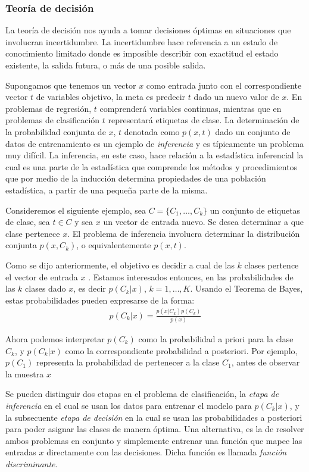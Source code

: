 \subsubsection{Teoría de decisión}
	
	La teoría de decisión nos ayuda a tomar decisiones óptimas en situaciones que involucran incertidumbre. La incertidumbre hace referencia a un estado de conocimiento limitado donde es imposible describir con exactitud el estado existente, la salida futura, o más de una posible salida.
	
	Supongamos que tenemos un vector $x$ como entrada junto con el correspondiente vector $t$ de variables objetivo, la meta es predecir $t$ dado un nuevo valor de $x$. En problemas de regresión, $t$ comprenderá variables continuas, mientras que en problemas de clasificación $t$ representará etiquetas de clase. La determinación de la probabilidad conjunta de $x$, $t$ denotada como $p(x,t)$ dado un conjunto de datos de entrenamiento es un ejemplo de \textit{inferencia} y es típicamente un problema muy difícil. La inferencia, en este caso, hace relación a la estadística inferencial la cual es una parte de la estadística que comprende los métodos y procedimientos que por medio de la inducción determina propiedades de una población estadística, a partir de una pequeña parte de la misma.
	
	Consideremos el siguiente ejemplo, sea $C=\{C_1,\dots,C_k\}$ un conjunto de etiquetas de clase, sea $t \in C$ y sea $x$ un vector de entrada nuevo. Se desea determinar a que clase pertenece $x$. El problema de inferencia involucra determinar la distribución conjunta $p(x,C_k)$, o equivalentemente $p(x,t)$.

	Como se dijo anteriormente, el objetivo es decidir a cual de las $k$ clases pertence el vector de entrada $x$ . Estamos interesados entonces, en las probabilidades de las $k$ clases dado $x$, es decir $p(C_k|x)$, $k=1,\dots,K$. Usando el Teorema de Bayes, estas probabilidades pueden expresarse de la forma:
		\begin{align*}
			p(C_k|x) = \frac{p(x|C_k)p(C_k)}{p(x)}
		\end{align*}

	Ahora podemos interpretar $p(C_k)$ como la probabilidad a priori para la clase $C_k$, y $p(C_k|x)$ como la correspondiente probabilidad a posteriori. Por ejemplo, $p(C_1)$ representa la probabilidad de pertenecer a la clase $C_1$, antes de observar la muestra $x$
	
	Se pueden distinguir dos etapas en el problema de clasificación, la \textit{etapa de inferencia} en el cual se usan los datos para entrenar el modelo para $p(C_k|x)$, y la subsecuente \textit{etapa de decisión} en la cual se usan las probabilidades a posteriori para poder asignar las clases de manera óptima. Una alternativa, es la de resolver ambos problemas en conjunto y simplemente entrenar una función que mapee las entradas $x$ directamente con las decisiones. Dicha función es llamada \textit{función discriminante}.
	
